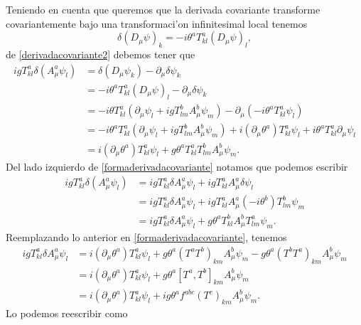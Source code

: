 Teniendo en cuenta que queremos que la derivada covariante transforme covariantemente bajo una transformaci'on infinitesimal local tenemos
\begin{equation}
\delta (D_\mu \psi)_k=-i\theta^aT^a_{kl}(D_\mu\psi)_l,
\end{equation}
de \eqref{derivadacovariante2} debemos tener que
\begin{equation}\label{formaderivadacovariante}
\begin{aligned}
igT^a_{kl}\delta(A^a_\mu \psi_l)&=\delta(D_\mu\psi_k)-\partial_\mu \delta\psi_k \\
&=-i\theta^a T^a_{kl}(D_\mu\psi)_l-\partial_\mu \delta\psi_k \\
&= -i\theta T^a_{kl}(\partial_\mu \psi_l+igT^b_{lm}A^b_\mu\psi_m)-\partial_\mu (-i\theta^a T^a_{kl}\psi_l) \\
&= -i\theta^aT^a_{kl}(\partial_\mu \psi_l+igT^b_{lm}A^b_\mu\psi_m)+i(\partial_\mu\theta^a)T^a_{kl}\psi_l+i\theta^a T^a_{kl}\partial_\mu \psi_l \\
&= i(\partial_\mu \theta^a)T^a_{kl}\psi_l+g\theta^aT^a_{kl}T^b_{lm}A^b_\mu \psi_m.
\end{aligned}
\end{equation}
Del lado izquierdo de \eqref{formaderivadacovariante} notamos que podemos escribir
\begin{equation}
\begin{aligned}
igT^a_{kl}\delta(A^a_\mu \psi_l)&=igT^a_{kl}\delta A^a_\mu\psi_l+igT^a_{kl}A^a_\mu \delta\psi_l \\
&=igT^a_{kl}\delta A^a_\mu \psi_l+igT^a_{kl}A^a_\mu(-i\theta^b)T^b_{lm}\psi_m \\
&= igT^a_{kl}\delta A^a_\mu \psi_l+g\theta^a T^b_{kl}A^b_\mu T^a_{lm}\psi_m.
\end{aligned}
\end{equation} 
Reemplazando lo anterior en \eqref{formaderivadacovariante}, tenemos
\begin{equation}
\begin{aligned}
igT^a_{kl}\delta A^a_\mu \psi_l&=i(\partial_\mu \theta^a)T^a_{kl}\psi_l+g\theta^a(T^aT^b)_{km}A^b_\mu \psi_m-g\theta^a(T^bT^a)_{km}A^b_\mu \psi_m \\
&= i(\partial_\mu \theta^a)T^a_{kl}\psi_l +g\theta^a[T^a,T^b]_{km}A^b_\mu \psi_m \\
&= i(\partial_\mu \theta^a)T^a_{kl}\psi_l+ig\theta^a f^{abc}(T^c)_{km}A^b_\mu \psi_m.
\end{aligned}
\end{equation}
Lo podemos reescribir como
